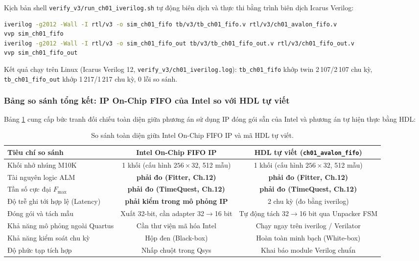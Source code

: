 Kịch bản shell \texttt{verify\_v3/run\_ch01\_iverilog.sh} tự động biên dịch và thực thi bằng trình biên dịch Icarus Verilog:
\begin{lstlisting}[language=bash, basicstyle=\small\ttfamily, frame=single]
iverilog -g2012 -Wall -I rtl/v3 -o sim_ch01_fifo tb/v3/tb_ch01_fifo.v rtl/v3/ch01_avalon_fifo.v
vvp sim_ch01_fifo
iverilog -g2012 -Wall -I rtl/v3 -o sim_ch01_fifo_out tb/v3/tb_ch01_fifo_out.v rtl/v3/ch01_fifo_out.v
vvp sim_ch01_fifo_out
\end{lstlisting}
Kết quả chạy trên Linux (Icarus Verilog 12, \texttt{verify\_v3/ch01\_iverilog.log}): \texttt{tb\_ch01\_fifo} khớp twin 2\,107/2\,107 chu kỳ, \texttt{tb\_ch01\_fifo\_out} khớp 1\,217/1\,217 chu kỳ, 0 lỗi so sánh.

\subsubsection*{Bảng so sánh tổng kết: IP On-Chip FIFO của Intel so với HDL tự viết}
Bảng \ref{tab:ch01_ip_vs_hdl} cung cấp bức tranh đối chiếu toàn diện giữa phương án sử dụng IP đóng gói sẵn của Intel và phương án tự hiện thực bằng HDL:

\begin{table}[H]
\centering
\caption{So sánh toàn diện giữa Intel On-Chip FIFO IP và mã HDL tự viết.}
\label{tab:ch01_ip_vs_hdl}
\footnotesize
\setlength{\tabcolsep}{4pt}
\begin{tabular}{lcc}
\toprule
\textbf{Tiêu chí so sánh} & \textbf{Intel On-Chip FIFO IP} & \textbf{HDL tự viết (\texttt{ch01\_avalon\_fifo})} \\
\midrule
Khối nhớ nhúng M10K & 1 khối (cấu hình $256 \times 32$, 512 mẫu) & 1 khối (cấu hình $256 \times 32$, 512 mẫu) \\
Tài nguyên logic ALM & \textbf{phải đo (Fitter, Ch.12)} & \textbf{phải đo (Fitter, Ch.12)} \\
Tần số cực đại $F_{\max}$ & \textbf{phải đo (TimeQuest, Ch.12)} & \textbf{phải đo (TimeQuest, Ch.12)} \\
Độ trễ ghi tới hợp lệ (Latency) & \textbf{phải kiểm trong mô phỏng IP} & 2 chu kỳ (đo bằng iverilog) \\
Đóng gói và tách mẫu & Xuất 32-bit, cần adapter 32$\to$16 bit & Tự động tách 32$\to$16 bit qua Unpacker FSM \\
Khả năng mô phỏng ngoài Quartus & Cần thư viện mã hóa Intel & Chạy ngay trên iverilog / Verilator \\
Khả năng kiểm soát chu kỳ & Hộp đen (Black-box) & Hoàn toàn minh bạch (White-box) \\
Độ phức tạp tích hợp & Nhấp chuột trong Qsys & Khai báo module Verilog chuẩn \\
\bottomrule
\end{tabular}
\end{table}


